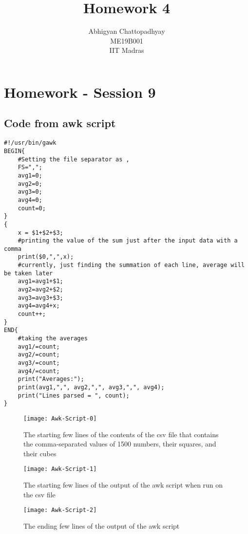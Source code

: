 \documentclass{article}
\title{Homework 4}
\author{Abhigyan Chattopadhyay
  \\ME19B001
  \\IIT Madras
}
\begin{document}
\maketitle

\pagebreak
\section{Homework - Session 9}
\subsection{Code from awk script}

\begin{lstlisting}
#!/usr/bin/gawk
BEGIN{
  	#Setting the file separator as ,
  	FS=",";
	avg1=0;
	avg2=0;
	avg3=0;
	avg4=0;
	count=0;
}
{
	x = $1+$2+$3;
	#printing the value of the sum just after the input data with a comma
	print($0,",",x);
	#currently, just finding the summation of each line, average will be taken later
	avg1=avg1+$1;
	avg2=avg2+$2;
	avg3=avg3+$3;
	avg4=avg4+x;
	count++;
}
END{
  	#taking the averages
	avg1/=count;
	avg2/=count;
	avg3/=count;
	avg4/=count;
	print("Averages:");
	print(avg1,",", avg2,",", avg3,",", avg4);
	print("Lines parsed = ", count);
}
\end{lstlisting}

\begin{figure}
  \texttt{[image: Awk-Script-0]}
  \caption{The starting few lines of the contents of the csv file that contains the comma-separated values of 1500 numbers, their squares, and their cubes}
  \label{fig:pic1}
\end{figure}


\begin{figure}
  \texttt{[image: Awk-Script-1]}
  \caption{The starting few lines of the output of the awk script when run on the csv file}
  \label{fig:pic2}
\end{figure}


\begin{figure}
  \texttt{[image: Awk-Script-2]}
  \caption{The ending few lines of the output of the awk script}
  \label{fig:pic3}
\end{figure}
\end{document}
